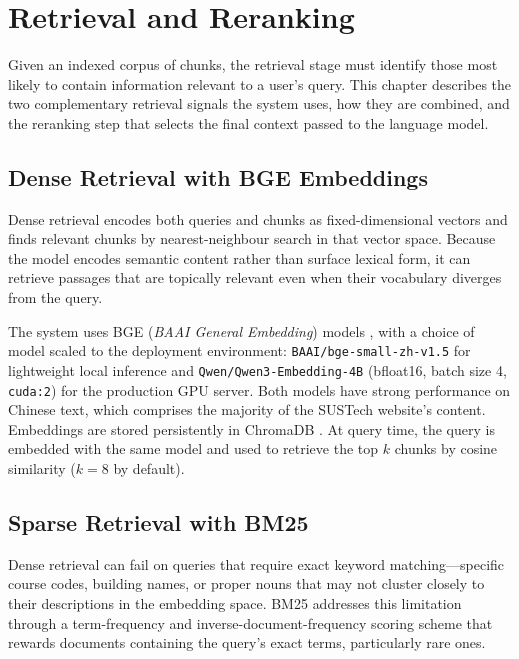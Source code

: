 \chapter{Retrieval and Reranking}

Given an indexed corpus of chunks, the retrieval stage must identify those most likely to contain information relevant to a user's query. This chapter describes the two complementary retrieval signals the system uses, how they are combined, and the reranking step that selects the final context passed to the language model.

\section{Dense Retrieval with BGE Embeddings}

Dense retrieval encodes both queries and chunks as fixed-dimensional vectors and finds relevant chunks by nearest-neighbour search in that vector space. Because the model encodes semantic content rather than surface lexical form, it can retrieve passages that are topically relevant even when their vocabulary diverges from the query.

The system uses BGE (\textit{BAAI General Embedding}) models \parencite{bge2024}, with a choice of model scaled to the deployment environment: \texttt{BAAI/bge-small-zh-v1.5} for lightweight local inference and \texttt{Qwen/Qwen3-Embedding-4B} (bfloat16, batch size 4, \texttt{cuda:2}) for the production GPU server. Both models have strong performance on Chinese text, which comprises the majority of the SUSTech website's content. Embeddings are stored persistently in ChromaDB \parencite{chromadb}. At query time, the query is embedded with the same model and used to retrieve the top $k$ chunks by cosine similarity ($k=8$ by default).

\section{Sparse Retrieval with BM25}

Dense retrieval can fail on queries that require exact keyword matching---specific course codes, building names, or proper nouns that may not cluster closely to their descriptions in the embedding space. BM25 \parencite{bm25Robertson2009} addresses this limitation through a term-frequency and inverse-document-frequency scoring scheme that rewards documents containing the query's exact terms, particularly rare ones.


